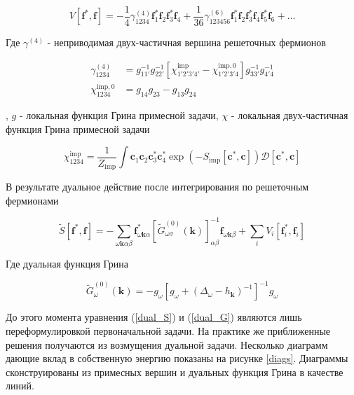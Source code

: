 \documentclass[11pt,a4paper]{report}
\begin{document}
\begin{equation}
 V[\mathbf{f}^*,\mathbf{f}] = -\frac{1}{4} \gamma_{1234}^{(4)}\mathbf{f}^*_{1}\mathbf{f}_{2}\mathbf{f}^*_{3}\mathbf{f}_{4} + 
 \frac{1}{36} \gamma_{123456}^{(6)}\mathbf{f}^*_{1}\mathbf{f}_{2}\mathbf{f}^*_{3}\mathbf{f}_{4}\mathbf{f}^*_{5}\mathbf{f}_{6} + \dots
\end{equation}

Где $\gamma^{(4)}$ - неприводимая двух-частичная вершина решеточных фермионов

\begin{equation}
\begin{split}
 \gamma_{1234}^{(4)} &= g_{11'}^{-1}g_{22'}^{-1}\left[\chi_{1'2'3'4'}^{\text{imp}}-\chi_{1'2'3'4}^{\text{imp},0}\right]g_{33'}^{-1}g_{4'4}^{-1} \\
 \chi_{1234}^{\text{imp},0} &= g_{14}g_{23} - g_{13}g_{24}
\end{split}
\end{equation}

, $g$ - локальная функция Грина примесной задачи, $\chi$ - локальная двух-частичная функция Грина примесной задачи

\begin{equation}
 \chi_{1234}^{\text{imp}} = \frac{1}{Z_{\text{imp}}} \int \mathbf{c}_1 \mathbf{c}_2 \mathbf{c}^*_3 \mathbf{c}^*_4 \exp{(-S_{\text{imp}}[\mathbf{c}^*,\mathbf{c}])}\mathcal{D}[\mathbf{c}^*,\mathbf{c}]
\end{equation}

В результате дуальное действие после интегрирования по решеточным фермионами

\begin{equation}
 \label{dual_S}
 \tilde{S}[\mathbf{f}^*,\mathbf{f}] = -\sum_{\omega\mathbf{k}\alpha\beta}\mathbf{f}^*_{\omega\mathbf{k}\alpha}[\tilde{G}^{(0)}_{\omega\sigma}(\mathbf{k})]_{\alpha\beta}^{-1}\mathbf{f}_{\omega\mathbf{k}\beta}+\sum_i V_i[\mathbf{f}^*_i,\mathbf{f}_i]
\end{equation}

Где дуальная функция Грина

\begin{equation}
 \label{dual_G}
 \tilde{G}^{(0)}_\omega(\mathbf{k}) = -g_\omega\left[g_\omega+(\Delta_\omega-h_\mathbf{k})^{-1}\right]^{-1} g_\omega
\end{equation}

До этого момента уравнения (\ref{dual_S}) и (\ref{dual_G}) являются лишь переформулировкой первоначальной задачи. На практике же приближенные решения получаются из возмущения дуальной задачи.
Несколько диаграмм дающие вклад в собственную энергию показаны на рисунке \ref{diags}. Диаграммы сконструированы из примесных вершин и дуальных функция Грина в качестве линий.
\end{document}
